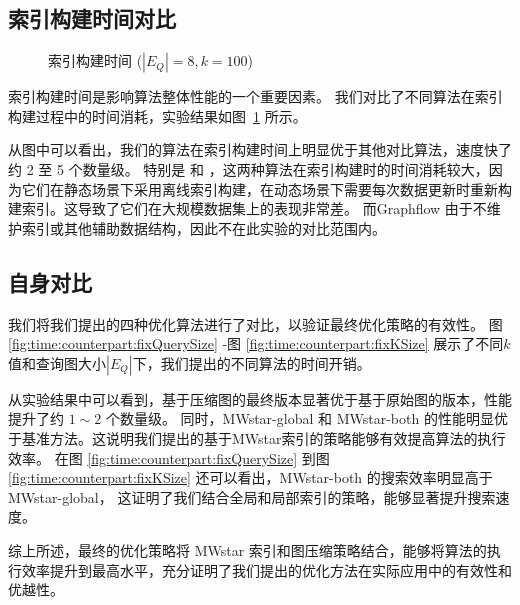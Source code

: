 \subsection{索引构建时间对比}
\label{ch5:index-construction}
\begin{figure}[h!]
    \centering
    \caption{索引构建时间  ($|E_Q|=8, k=100$)}
    \label{fig:exp:time:index}
\end{figure} 
索引构建时间是影响算法整体性能的一个重要因素。
我们对比了不同算法在索引构建过程中的时间消耗，实验结果如图~\ref{fig:exp:time:index} 所示。   


从图中可以看出，我们的算法在索引构建时间上明显优于其他对比算法，速度快了约 2 至 5 个数量级。
特别是 \itk 和 \pm，这两种算法在索引构建时的时间消耗较大，因为它们在静态场景下采用离线索引构建，在动态场景下需要每次数据更新时重新构建索引。这导致了它们在大规模数据集上的表现非常差。
而Graphflow 由于不维护索引或其他辅助数据结构，因此不在此实验的对比范围内。

\subsection{自身对比}
\label{ch5:couterparts}




\label{sec:couterparts}
我们将我们提出的四种优化算法进行了对比，以验证最终优化策略的有效性。
图 \ref{fig:time:counterpart:fixQuerySize} -图 \ref{fig:time:counterpart:fixKSize} 展示了不同$k$值和查询图大小$|E_Q|$下，我们提出的不同算法的时间开销。

从实验结果中可以看到，基于压缩图的最终版本显著优于基于原始图的版本，性能提升了约 $1{\sim}2$ 个数量级。
同时，MWstar-global 和 MWstar-both 的性能明显优于基准方法。这说明我们提出的基于MWstar索引的策略能够有效提高算法的执行效率。
在图 \ref{fig:time:counterpart:fixQuerySize} 到图 \ref{fig:time:counterpart:fixKSize} 还可以看出，MWstar-both 的搜索效率明显高于 MWstar-global，
这证明了我们结合全局和局部索引的策略，能够显著提升搜索速度。

综上所述，最终的优化策略将 MWstar 索引和图压缩策略结合，能够将算法的执行效率提升到最高水平，充分证明了我们提出的优化方法在实际应用中的有效性和优越性。

